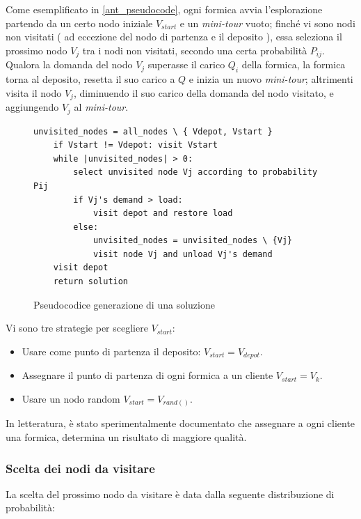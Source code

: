 \documentclass[11pt,a4paper]{article}
\begin{document}
\vspace{.3cm}
\noindent
Come esemplificato in \autoref{ant_pseudocode}, ogni formica avvia l'esplorazione partendo da un certo nodo iniziale \(V_{start}\) e un \textit{mini-tour} vuoto; finché vi sono nodi non visitati ( ad eccezione del nodo di partenza e il deposito ), essa seleziona il prossimo nodo \(V_j\) tra i nodi non visitati, secondo una certa probabilità \(P_{ij}\). Qualora la domanda del nodo \(V_j\) superasse il carico \(Q_i\) della formica, la formica torna al deposito, resetta il suo carico a \(Q\) e inizia un nuovo \textit{mini-tour}; altrimenti visita il nodo \(V_j\), diminuendo il suo carico della domanda del nodo visitato, e aggiungendo \(V_j\) al \textit{mini-tour}.
\begin{figure}[H]
  \caption{Pseudocodice generazione di una soluzione}
  \label{ant_pseudocode}
\begin{lstlisting}[gobble=2]
    unvisited_nodes = all_nodes \ { Vdepot, Vstart }
    if Vstart != Vdepot: visit Vstart
    while |unvisited_nodes| > 0:
        select unvisited node Vj according to probability Pij
        if Vj's demand > load:
            visit depot and restore load
        else:
            unvisited_nodes = unvisited_nodes \ {Vj}
            visit node Vj and unload Vj's demand
    visit depot
    return solution
\end{lstlisting}
\end{figure}
\noindent
Vi sono tre strategie per scegliere \(V_{start}\):
\begin{itemize}
    \item Usare come punto di partenza il deposito: \(V_{start}=V_{depot}\).
    \item Assegnare il punto di partenza di ogni formica a un cliente \(V_{start}=V_{k}\).
    \item Usare un nodo random \(V_{start}=V_{rand()}\).
\end{itemize}
In letteratura, è stato sperimentalmente documentato che assegnare a ogni cliente una formica, determina un risultato di maggiore qualità.

\subsubsection{Scelta dei nodi da visitare}
La scelta del prossimo nodo da visitare è data dalla seguente distribuzione di probabilità:
\end{document}
